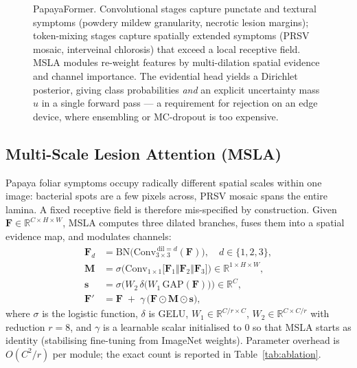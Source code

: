 \documentclass[10pt,twocolumn,a4paper]{article}
\newcommand{\R}{\mathbb{R}}
\newcommand{\bF}{\mathbf{F}}
\begin{document}
\begin{figure}[t]
\caption{PapayaFormer. Convolutional stages capture punctate and textural symptoms (powdery mildew granularity, necrotic lesion margins); token-mixing stages capture spatially extended symptoms (PRSV mosaic, interveinal chlorosis) that exceed a local receptive field. MSLA modules re-weight features by multi-dilation spatial evidence and channel importance. The evidential head yields a Dirichlet posterior, giving class probabilities \emph{and} an explicit uncertainty mass $u$ in a single forward pass --- a requirement for rejection on an edge device, where ensembling or MC-dropout is too expensive.}
\label{fig:arch}
\end{figure}

\subsection{Multi-Scale Lesion Attention (MSLA)}
Papaya foliar symptoms occupy radically different spatial scales within one image: bacterial spots are a few pixels across, PRSV mosaic spans the entire lamina. A fixed receptive field is therefore mis-specified by construction. Given $\bF \in \R^{C\times H\times W}$, MSLA computes three dilated branches, fuses them into a spatial evidence map, and modulates channels:
\begin{align}
\bF_d &= \mathrm{BN}\big(\mathrm{Conv}_{3\times3}^{\,\text{dil}=d}(\bF)\big), \quad d\in\{1,2,3\},\\
\mathbf{M} &= \sigma\Big(\mathrm{Conv}_{1\times1}\big[\bF_1 \Vert \bF_2 \Vert \bF_3\big]\Big) \in \R^{1\times H\times W},\\
\mathbf{s} &= \sigma\Big(W_2\,\delta\big(W_1\,\mathrm{GAP}(\bF)\big)\Big) \in \R^{C},\\
\bF' &= \bF \;+\; \gamma\,\big(\bF \odot \mathbf{M} \odot \mathbf{s}\big),
\end{align}
where $\sigma$ is the logistic function, $\delta$ is GELU, $W_1\in\R^{C/r\times C}$, $W_2\in\R^{C\times C/r}$ with reduction $r=8$, and $\gamma$ is a learnable scalar initialised to $0$ so that MSLA starts as identity (stabilising fine-tuning from ImageNet weights). Parameter overhead is $O(C^2/r)$ per module; the exact count is reported in Table~\ref{tab:ablation}.
\end{document}
